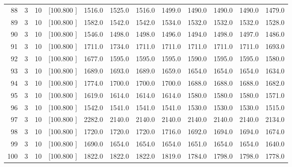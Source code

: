 \documentclass[12pt,a4paper]{article}
\begin{document}
\begin{center}
{\begin{tabular}{r r r r r r r r r r r r}
  88&  3& 10&[100.800   ]&  1516.0&  1525.0&  1516.0&  1499.0&  1490.0&  1490.0&  1490.0&  1479.0\\[-0.02in]
  89&  3& 10&[100.800   ]&  1582.0&  1542.0&  1542.0&  1534.0&  1532.0&  1532.0&  1532.0&  1528.0\\[-0.02in]
  90&  3& 10&[100.800   ]&  1546.0&  1498.0&  1498.0&  1496.0&  1494.0&  1498.0&  1497.0&  1486.0\\[-0.02in]
  91&  3& 10&[100.800   ]&  1711.0&  1734.0&  1711.0&  1711.0&  1711.0&  1711.0&  1711.0&  1693.0\\[-0.02in]
  92&  3& 10&[100.800   ]&  1677.0&  1595.0&  1595.0&  1595.0&  1590.0&  1595.0&  1595.0&  1580.0\\[-0.02in]
  93&  3& 10&[100.800   ]&  1689.0&  1693.0&  1689.0&  1659.0&  1654.0&  1654.0&  1654.0&  1634.0\\[-0.02in]
  94&  3& 10&[100.800   ]&  1774.0&  1700.0&  1700.0&  1700.0&  1688.0&  1688.0&  1688.0&  1682.0\\[-0.02in]
  95&  3& 10&[100.800   ]&  1619.0&  1614.0&  1614.0&  1614.0&  1580.0&  1580.0&  1580.0&  1571.0\\[-0.02in]
  96&  3& 10&[100.800   ]&  1542.0&  1541.0&  1541.0&  1541.0&  1530.0&  1530.0&  1530.0&  1515.0\\[-0.02in]
  97&  3& 10&[100.800   ]&  2282.0&  2140.0&  2140.0&  2140.0&  2140.0&  2140.0&  2140.0&  2134.0\\[-0.02in]
  98&  3& 10&[100.800   ]&  1720.0&  1720.0&  1720.0&  1716.0&  1692.0&  1694.0&  1694.0&  1674.0\\[-0.02in]
  99&  3& 10&[100.800   ]&  1690.0&  1654.0&  1654.0&  1654.0&  1651.0&  1654.0&  1654.0&  1640.0\\[-0.02in]
 100&  3& 10&[100.800   ]&  1822.0&  1822.0&  1822.0&  1819.0&  1784.0&  1798.0&  1798.0&  1778.0\\[-0.02in]

\hline
\end{tabular}}
\end{center}
\newpage
\end{document}
